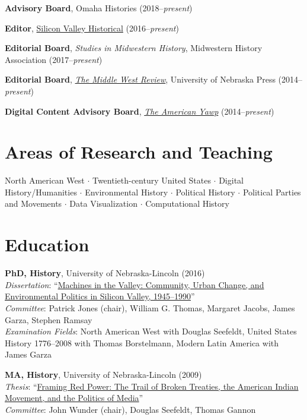 \textbf{Advisory Board}, Omaha Histories (2018--\emph{present})

\textbf{Editor}, \href{http://svhistorical.org}{Silicon Valley
Historical} (2016--\emph{present})

\textbf{Editorial Board}, \emph{Studies in Midwestern History},
Midwestern History Association (2017--\emph{present})

\textbf{Editorial Board},
\emph{\href{https://uimiddle.wordpress.com/}{The Middle West Review}},
University of Nebraska Press (2014--\emph{present})

\textbf{Digital Content Advisory Board},
\emph{\href{http://www.americanyawp.com/}{The American Yawp}}
(2014--\emph{present})

\section{Areas of Research and
Teaching}\label{areas-of-research-and-teaching}

North American West \(\cdot\) Twentieth-century United States \(\cdot\)
Digital History/Humanities \(\cdot\) Environmental History \(\cdot\)
Political History \(\cdot\) Political Parties and Movements \(\cdot\)
Data Visualization \(\cdot\) Computational History

\newpage

\section{Education}\label{education}

\textbf{PhD, History}, University of Nebraska-Lincoln (2016)\\
\emph{Dissertation}:
``\href{http://digitalcommons.unl.edu/historydiss/86/}{Machines in the
Valley: Community, Urban Change, and Environmental Politics in Silicon
Valley, 1945--1990}''\\
\emph{Committee}: Patrick Jones (chair), William G. Thomas, Margaret
Jacobs, James Garza, Stephen Ramsay\\
\emph{Examination Fields}: North American West with Douglas Seefeldt,
United States History 1776--2008 with Thomas Borstelmann, Modern Latin
America with James Garza

\textbf{MA, History}, University of Nebraska-Lincoln (2009)\\
\emph{Thesis}:
``\href{http://digitalcommons.unl.edu/historydiss/21/}{Framing Red
Power: The Trail of Broken Treaties, the American Indian Movement, and
the Politics of Media}''\\
\emph{Committee}: John Wunder (chair), Douglas Seefeldt, Thomas Gannon

